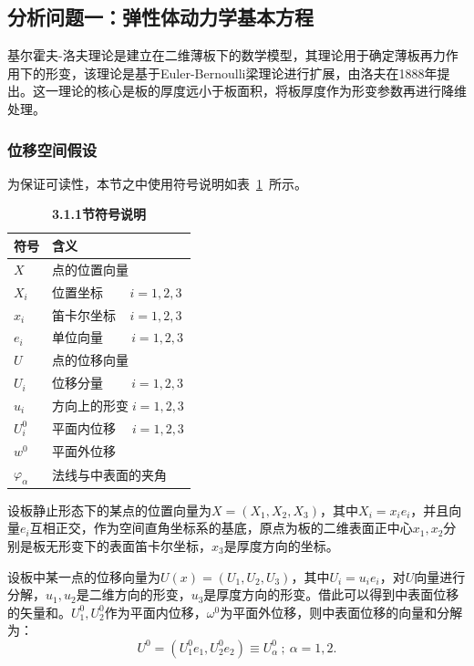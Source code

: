 \documentclass[withoutpreface,bwprint]{cumcmthesis} %
\begin{document}
\subsection{分析问题一：弹性体动力学基本方程}
基尔霍夫-洛夫理论是建立在二维薄板下的数学模型，其理论用于确定薄板再力作用下的形变，该理论是基于Euler-Bernoulli梁理论进行扩展，由洛夫在1888年提出。这一理论的核心是板的厚度远小于板面积，将板厚度作为形变参数再进行降维处理。
\subsubsection{位移空间假设}
为保证可读性，本节之中使用符号说明如表~\ref{table-1}~所示。
\begin{table}[H]
		\caption{\textbf{3.1.1节符号说明}}%
		\centering
		\begin{tabular}{ll}%
			\hline %
			符号   &  含义  \\
			\hline %
			$X$        & 点的位置向量  \\
			$X_{i}$  &位置坐标$\;\;\;\;\;\;\;\,i=1,2,3$ \\
		    $x_{i}$  &笛卡尔坐标$\;\;\;\;i=1,2,3 $  \\
			$e_{i}$  &单位向量$\;\;\;\;\;\;\;\;i=1,2,3$\\
			$U$      & 点的位移向量  \\
			$U_{i}$  &位移分量$\;\;\;\;\;\;\;\;i=1,2,3$ \\
			$u_{i}$  &方向上的形变$\;i=1,2,3 $  \\
			$U^0_{i}$  &平面内位移$\;\;\;\;\,i=1,2,3$ \\
			$w^{0}$&平面外位移\\
			$\varphi_{\alpha}$&法线与中表面的夹角\\
			\hline %
		\end{tabular} 
  \label{table-1}
\end{table}

设板静止形态下的某点的位置向量为$X=\left(X_1,X_2,X_3\right)$，其中$X_i=x_ie_i$，并且向量$e_i$互相正交，作为空间直角坐标系的基底，原点为板的二维表面正中心$x_1,x_2$分别是板无形变下的表面笛卡尔坐标，$x_3$是厚度方向的坐标。

设板中某一点的位移向量为$U(x)=\left(U_1,U_2,U_3\right)$，其中$U_i=u_ie_i$，对$U$向量进行分解，$u_1,u_2$是二维方向的形变，$u_3$是厚度方向的形变。借此可以得到中表面位移的矢量和。$U^0_1,U^0_2$作为平面内位移，$\omega^0$为平面外位移，则中表面位移的向量和分解为：
\begin{equation}  U^0=\left(U^0_1e_1,U^0_2e_2\right)\equiv U^0_{\alpha}~;~\alpha=1,2.\label{1}
\end{equation}
\end{document}
